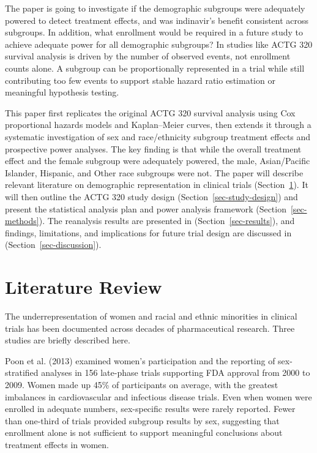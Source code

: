 \documentclass[
  letterpaper,
  DIV=11,
  numbers=noendperiod]{scrartcl}
\begin{document}
The paper is going to investigate if the demographic subgroups were
adequately powered to detect treatment effects, and was indinavir's
benefit consistent across subgroups. In addition, what enrollment would
be required in a future study to achieve adequate power for all
demographic subgroups? In studies like ACTG 320 survival analysis is
driven by the number of observed events, not enrollment counts alone. A
subgroup can be proportionally represented in a trial while still
contributing too few events to support stable hazard ratio estimation or
meaningful hypothesis testing.

This paper first replicates the original ACTG 320 survival analysis
using Cox proportional hazards models and Kaplan--Meier curves, then
extends it through a systematic investigation of sex and race/ethnicity
subgroup treatment effects and prospective power analyses. The key
finding is that while the overall treatment effect and the female
subgroup were adequately powered, the male, Asian/Pacific Islander,
Hispanic, and Other race subgroups were not. The paper will describe
relevant literature on demographic representation in clinical trials
(Section~\ref{sec-lit-review}). It will then outline the ACTG 320 study
design (Section~\ref{sec-study-design}) and present the statistical
analysis plan and power analysis framework (Section~\ref{sec-methods}).
The reanalysis results are presented in (Section~\ref{sec-results}), and
findings, limitations, and implications for future trial design are
discussed in (Section~\ref{sec-discussion}).

\section{Literature Review}\label{sec-lit-review}

The underrepresentation of women and racial and ethnic minorities in
clinical trials has been documented across decades of pharmaceutical
research. Three studies are briefly described here.

Poon et al. (2013) examined women's participation and the reporting of
sex-stratified analyses in 156 late-phase trials supporting FDA approval
from 2000 to 2009. Women made up 45\% of participants on average, with
the greatest imbalances in cardiovascular and infectious disease trials.
Even when women were enrolled in adequate numbers, sex-specific results
were rarely reported. Fewer than one-third of trials provided subgroup
results by sex, suggesting that enrollment alone is not sufficient to
support meaningful conclusions about treatment effects in women.
\end{document}
